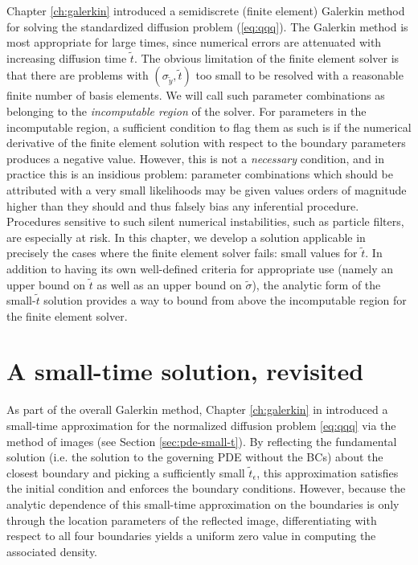 \label{ch:small-time}

Chapter \ref{ch:galerkin} introduced a semidiscrete (finite element)
Galerkin method for solving the standardized diffusion problem
(\ref{eq:qqq}). The Galerkin method is most appropriate for large
times, since numerical errors are attenuated with increasing diffusion
time $\tilde{t}$. The obvious limitation of the finite element solver
is that there are problems with $(\sigma_{\tilde{y}}, \tilde{t})$ too
small to be resolved with a reasonable finite number of basis
elements. We will call such parameter combinations as belonging to the
\textit{incomputable region} of the solver. For parameters in the
incomputable region, a sufficient condition to flag them as such is if
the numerical derivative of the finite element solution with respect
to the boundary parameters produces a negative value. However, this is
not a \textit{necessary} condition, and in practice this is an
insidious problem: parameter combinations which should be attributed
with a very small likelihoods may be given values orders of magnitude
higher than they should and thus falsely bias any inferential
procedure. Procedures sensitive to such silent numerical
instabilities, such as particle filters, are especially at risk. In
this chapter, we develop a solution applicable in precisely the cases
where the finite element solver fails: small values for
$\tilde{t}$. In addition to having its own well-defined criteria for
appropriate use (namely an upper bound on $\tilde{t}$ as well as an
upper bound on $\tilde{\sigma}$), the analytic form of the
small-$\tilde{t}$ solution provides a way to bound from above the
incomputable region for the finite element solver.


\section{A small-time solution, revisited}
As part of the overall Galerkin method, Chapter \ref{ch:galerkin} in
introduced a small-time approximation for the normalized diffusion
problem \eqref{eq:qqq} via the method of images (see Section
\ref{sec:pde-small-t}). By reflecting the fundamental solution
(i.e. the solution to the governing PDE without the BCs) about the
closest boundary and picking a sufficiently small
$\tilde{t}_\epsilon$, this approximation satisfies the initial
condition and enforces the boundary conditions. However, because the
analytic dependence of this small-time approximation on the boundaries
is only through the location parameters of the reflected image,
differentiating with respect to all four boundaries yields a uniform
zero value in computing the associated density.

